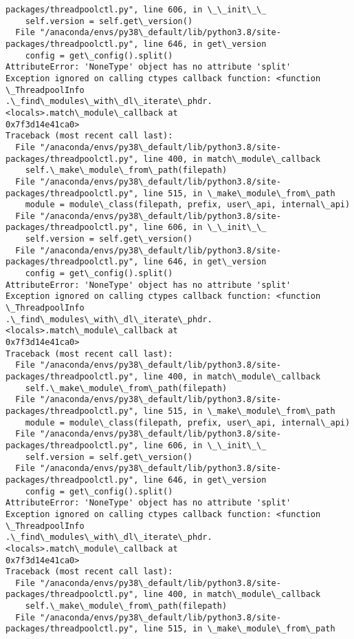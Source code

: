 \documentclass[11pt]{article}
\begin{document}
\begin{Verbatim}[commandchars=\\\{\}]
packages/threadpoolctl.py", line 606, in \_\_init\_\_
    self.version = self.get\_version()
  File "/anaconda/envs/py38\_default/lib/python3.8/site-
packages/threadpoolctl.py", line 646, in get\_version
    config = get\_config().split()
AttributeError: 'NoneType' object has no attribute 'split'
Exception ignored on calling ctypes callback function: <function \_ThreadpoolInfo
.\_find\_modules\_with\_dl\_iterate\_phdr.<locals>.match\_module\_callback at
0x7f3d14e41ca0>
Traceback (most recent call last):
  File "/anaconda/envs/py38\_default/lib/python3.8/site-
packages/threadpoolctl.py", line 400, in match\_module\_callback
    self.\_make\_module\_from\_path(filepath)
  File "/anaconda/envs/py38\_default/lib/python3.8/site-
packages/threadpoolctl.py", line 515, in \_make\_module\_from\_path
    module = module\_class(filepath, prefix, user\_api, internal\_api)
  File "/anaconda/envs/py38\_default/lib/python3.8/site-
packages/threadpoolctl.py", line 606, in \_\_init\_\_
    self.version = self.get\_version()
  File "/anaconda/envs/py38\_default/lib/python3.8/site-
packages/threadpoolctl.py", line 646, in get\_version
    config = get\_config().split()
AttributeError: 'NoneType' object has no attribute 'split'
Exception ignored on calling ctypes callback function: <function \_ThreadpoolInfo
.\_find\_modules\_with\_dl\_iterate\_phdr.<locals>.match\_module\_callback at
0x7f3d14e41ca0>
Traceback (most recent call last):
  File "/anaconda/envs/py38\_default/lib/python3.8/site-
packages/threadpoolctl.py", line 400, in match\_module\_callback
    self.\_make\_module\_from\_path(filepath)
  File "/anaconda/envs/py38\_default/lib/python3.8/site-
packages/threadpoolctl.py", line 515, in \_make\_module\_from\_path
    module = module\_class(filepath, prefix, user\_api, internal\_api)
  File "/anaconda/envs/py38\_default/lib/python3.8/site-
packages/threadpoolctl.py", line 606, in \_\_init\_\_
    self.version = self.get\_version()
  File "/anaconda/envs/py38\_default/lib/python3.8/site-
packages/threadpoolctl.py", line 646, in get\_version
    config = get\_config().split()
AttributeError: 'NoneType' object has no attribute 'split'
Exception ignored on calling ctypes callback function: <function \_ThreadpoolInfo
.\_find\_modules\_with\_dl\_iterate\_phdr.<locals>.match\_module\_callback at
0x7f3d14e41ca0>
Traceback (most recent call last):
  File "/anaconda/envs/py38\_default/lib/python3.8/site-
packages/threadpoolctl.py", line 400, in match\_module\_callback
    self.\_make\_module\_from\_path(filepath)
  File "/anaconda/envs/py38\_default/lib/python3.8/site-
packages/threadpoolctl.py", line 515, in \_make\_module\_from\_path

\end{Verbatim}
\end{document}
